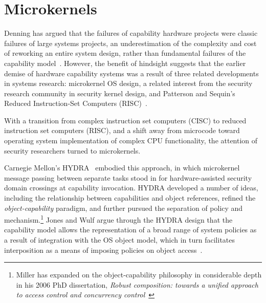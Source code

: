 

\section{Microkernels} %

Denning has argued that the failures of capability hardware projects were classic failures of
large systems projects, an underestimation of the complexity and cost of reworking an entire system
design, rather than fundamental failures of the capability model~\cite{denning:faulttolerance}.
However, the benefit of hindsight suggests that the earlier demise of hardware capability systems
was a result of three related developments in systems research: microkernel OS design, a
related interest from the security research community in security kernel design, and
Patterson and Sequin's Reduced Instruction-Set Computers (RISC)~\cite{patterson:risc}.

With a transition from complex instruction set computers (CISC) to reduced instruction
set computers (RISC), and a shift away from microcode toward operating system implementation
of complex CPU functionality, the attention of security researchers turned to microkernels.

Carnegie Mellon's HYDRA~\cite{CohenJefferson75,Wulf81} embodied this approach, in which microkernel
message passing between separate tasks stood in for hardware-assisted security domain crossings
at capability invocation.
HYDRA developed a number of ideas, including the relationship between
capabilities and object references, refined the {\em object-capability} paradigm, 
and
further pursued the separation of policy and mechanism.\footnote{Miller has expanded on the
object-capability philosophy in considerable depth in his 2006 PhD dissertation,
{\em Robust composition: towards a unified approach to access control and concurrency
control}~\cite{miller:robustcomposition}}
Jones and Wulf argue through the HYDRA design that the capability model allows the
representation of a broad range of
system policies as a result of integration with the OS object model, which in turn facilitates
interposition as a means of imposing policies on object access~\cite{Jones74}.

